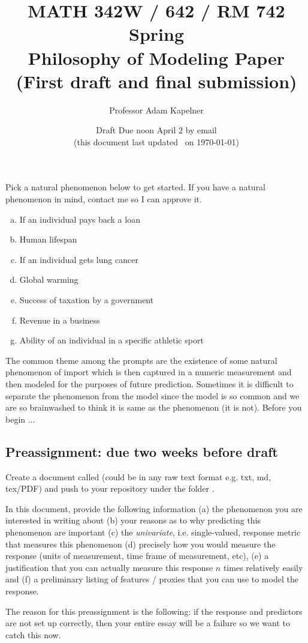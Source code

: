 \documentclass[12pt]{article}
\title{MATH 342W / 642 / RM 742 Spring \the\year \\ Philosophy of Modeling Paper \\ (First draft and final submission)}
\author{Professor Adam Kapelner} %
\date{Draft Due noon April 2 by email \\ \vspace{0.5cm} \small (this document last updated \currenttime~on \today)}
\begin{document}
\maketitle

\noindent Pick a natural phenomenon below to get started. If you have a natural phenomenon in mind, contact me so I can approve it.

\begin{enumerate}[(a)]
\item If an individual pays back a loan
\item Human lifespan
\item If an individual gets lung cancer
\item Global warming
\item Success of taxation by a government
\item Revenue in a business
\item Ability of an individual in a specific athletic sport 
\end{enumerate}

The common theme among the prompts are the existence of some natural phenomenon of import which is then captured in a numeric measurement and then modeled for the purposes of future prediction. Sometimes it is difficult to separate the phenomenon from the model since the model is so common and we are so brainwashed to think it is same as the phenomenon (it is not). Before you begin ...

\subsection*{Preassignment: due two weeks before draft}

Create a document called  (could be in any raw text format e.g. txt, md, tex/PDF) and push to your repository under the folder . 

In this document, provide the following information (a) the phenomenon you are interested in writing about (b) your reasons as to why predicting this phenomenon are important (c) the \emph{univariate}, i.e. single-valued, response metric that measures this phenomenon (d) precisely how you would measure the response (units of measurement, time frame of measurement, etc), (e) a justification that you can actually measure this response $n$ times relatively easily and (f) a preliminary listing of features / proxies that you can use to model the response. 

The reason for this preassignment is the following: if the response and predictors are not set up correctly, then your entire essay will be a failure so we want to catch this now.
\end{document}

